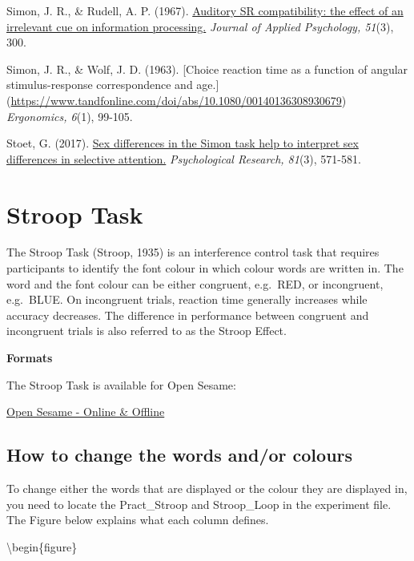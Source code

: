 \documentclass[
]{book}
\begin{document}
Simon, J. R., \& Rudell, A. P. (1967). \href{https://suprimo.lib.strath.ac.uk/permalink/f/1jihtat/TN_cdi_proquest_journals_614414775}{Auditory SR compatibility: the effect of an irrelevant cue on information processing.} \emph{Journal of Applied Psychology, 51}(3), 300.

Simon, J. R., \& Wolf, J. D. (1963). {[}Choice reaction time as a function of angular stimulus-response correspondence and age.{]} (\url{https://www.tandfonline.com/doi/abs/10.1080/00140136308930679}) \emph{Ergonomics, 6}(1), 99-105.

Stoet, G. (2017). \href{https://link.springer.com/content/pdf/10.1007/s00426-016-0763-4.pdf}{Sex differences in the Simon task help to interpret sex differences in selective attention.} \emph{Psychological Research, 81}(3), 571-581.

\hypertarget{stroop-task}{%
\section{Stroop Task}\label{stroop-task}}

The Stroop Task (Stroop, 1935) is an interference control task that requires participants to identify the font colour in which colour words are written in. The word and the font colour can be either congruent, e.g.~{RED}, or incongruent, e.g.~{BLUE}. On incongruent trials, reaction time generally increases while accuracy decreases. The difference in performance between congruent and incongruent trials is also referred to as the Stroop Effect.

\textbf{Formats}

The Stroop Task is available for Open Sesame:

\href{https://github.com/jmattschey/MScConversionExperiments/blob/master/GitHub/StroopTask.zip}{Open Sesame - Online \& Offline}

\hypertarget{how-to-change-the-words-andor-colours}{%
\subsection{How to change the words and/or colours}\label{how-to-change-the-words-andor-colours}}

To change either the words that are displayed or the colour they are displayed in, you need to locate the Pract\_Stroop and Stroop\_Loop in the experiment file. The Figure below explains what each column defines.

\textbackslash begin\{figure\}
\end{document}
